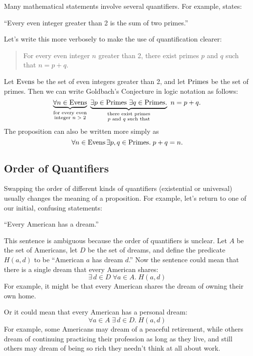 Many mathematical statements involve several quantifiers.  For
example,  states:
%
\begin{center}
``Every even integer greater than 2 is the sum of two primes.''
\end{center}
%
Let's write this more verbosely to make the use of quantification
clearer:
%
\begin{quote}
For every even integer $n$ greater than 2,
there exist primes $p$ and $q$ such that $n = p + q$.
\end{quote}
%
Let $\text{Evens}$ be the set of even integers greater than 2, and let $\text{Primes}$ be the
set of primes.  Then we can write Goldbach's Conjecture in logic
notation as follows:
%
\[
\underbrace{\forall n \in \text{Evens}}_{\substack
    {\text{for every even} \\
     \text{integer $n > 2$}}}
\
\underbrace{\exists p \in \text{Primes}\ \exists q \in \text{Primes}.}_{\substack
    {\text{there exist primes} \\
     \text{$p$ and $q$ such that}}}
\ n = p + q.
\]
The proposition can also be written more simply as
\[
 \forall n \in \text{Evens}\, \exists p, q \in \text{Primes}. \; p + q = n.
\]

\subsection{Order of Quantifiers}

Swapping the order of different kinds of quantifiers (existential or
universal) usually changes the meaning of a proposition.  For example,
let's return to one of our initial, confusing statements:
\begin{center}
``Every American has a dream.''
\end{center}

This sentence is ambiguous because the order of quantifiers is
unclear.  Let $A$ be the set of Americans, let $D$ be the set of
dreams, and define the predicate $H(a, d)$ to be ``American $a$ has
dream $d$.''  Now the sentence could mean that there is a single dream
that every American shares:
\[
\exists\, d \in D\; \forall a \in A.\; H(a, d)
\]
For example, it might be that every American shares the dream of owning
their own home.

Or it could mean that every American has a personal dream:
\[
\forall a \in A\; \exists\, d \in D.\; H(a, d)
\]
For example, some Americans may dream of a peaceful retirement, while
others dream of continuing practicing their profession as long as they
live, and still others may dream of being so rich they needn't think at
all about work.

